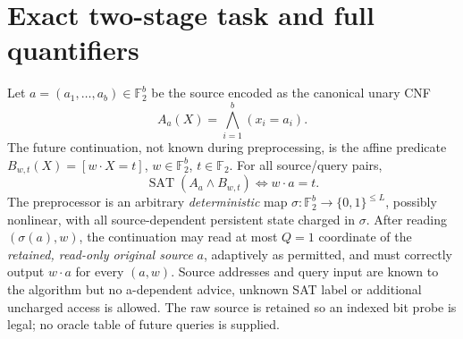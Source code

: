 \documentclass[10pt]{article}
\newcommand{\F}{\mathbb F_2}
\begin{document}
\section{Exact two-stage task and full quantifiers}
Let $a=(a_1,\dots,a_b)\in\F^b$ be the source encoded as the canonical unary CNF
\[
 A_a(X)=\bigwedge_{i=1}^b (x_i=a_i).
\]
The future continuation, not known during preprocessing, is the affine predicate $B_{w,t}(X)=[w\cdot X=t]$, $w\in\F^b$, $t\in\F$. For all source/query pairs,
\[
 \operatorname{SAT}(A_a\wedge B_{w,t})\iff w\cdot a=t.
\]
The preprocessor is an arbitrary \emph{deterministic} map $\sigma:\F^b\to\{0,1\}^{\le L}$, possibly nonlinear, with all source-dependent persistent state charged in $\sigma$. After reading $(\sigma(a),w)$, the continuation may read at most $Q=1$ coordinate of the \emph{retained, read-only original source} $a$, adaptively as permitted, and must correctly output $w\cdot a$ for every $(a,w)$. Source addresses and query input are known to the algorithm but no a-dependent advice, unknown SAT label or additional uncharged access is allowed. The raw source is retained so an indexed bit probe is legal; no oracle table of future queries is supplied.
\end{document}
